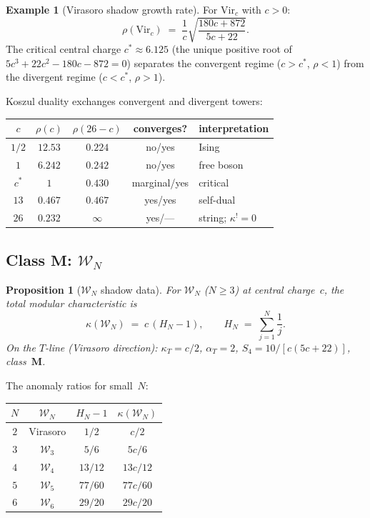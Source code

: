 \documentclass[11pt,reqno]{amsart}
\newtheorem{proposition}[theorem]{Proposition}
\theoremstyle{definition}
\newtheorem{example}[theorem]{Example}
\theoremstyle{remark}
\newcommand{\cW}{\mathcal{W}}
\newcommand{\Vir}{\mathrm{Vir}}
\numberwithin{equation}{section}
\begin{document}
\begin{example}[Virasoro shadow growth
rate]\label{ex:virasoro-rho}
For $\Vir_c$ with $c > 0$:
\[
 \rho(\Vir_c)
 \;=\;
 \frac{1}{c}
 \sqrt{\frac{180c + 872}{5c + 22}}.
\]
The critical central charge $c^* \approx 6.125$ (the
unique positive root of $5c^3 + 22c^2 - 180c - 872 = 0$)
separates the convergent regime ($c > c^*$, $\rho < 1$)
from the divergent regime ($c < c^*$, $\rho > 1$).

Koszul duality exchanges convergent and divergent towers:
\begin{center}
\renewcommand{\arraystretch}{1.2}
\begin{tabular}{ccccl}
\toprule
$c$ & $\rho(c)$ & $\rho(26{-}c)$ & converges? &
 interpretation \\
\midrule
$1/2$ & $12.53$ & $0.224$ & no/yes & Ising \\
$1$ & $6.242$ & $0.242$ & no/yes & free boson \\
$c^*$ & $1$ & $0.430$ & marginal/yes & critical \\
$13$ & $0.467$ & $0.467$ & yes/yes & self-dual \\
$26$ & $0.232$ & $\infty$ & yes/--- &
 string; $\kappa^! = 0$ \\
\bottomrule
\end{tabular}
\end{center}
\end{example}


\subsection{Class $\mathbf{M}$:
$\cW_N$}\label{subsec:wn}

\begin{proposition}[$\cW_N$ shadow
data]\label{prop:wn}
For $\cW_N$ ($N \ge 3$) at central charge~$c$, the
total modular characteristic is
\[
 \kappa(\cW_N)
 \;=\;
 c\,(H_N - 1),
 \qquad
 H_N \;=\; \sum_{j=1}^{N} \frac{1}{j}.
\]
On the $T$-line (Virasoro direction):
$\kappa_T = c/2$, $\alpha_T = 2$,
$S_4 = 10/[c(5c+22)]$, class~$\mathbf{M}$.
\end{proposition}

The anomaly ratios for small~$N$:

\begin{center}
\renewcommand{\arraystretch}{1.2}
\begin{tabular}{cccc}
\toprule
$N$ & $\cW_N$ & $H_N - 1$ & $\kappa(\cW_N)$ \\
\midrule
$2$ & Virasoro & $1/2$ & $c/2$ \\
$3$ & $\cW_3$ & $5/6$ & $5c/6$ \\
$4$ & $\cW_4$ & $13/12$ & $13c/12$ \\
$5$ & $\cW_5$ & $77/60$ & $77c/60$ \\
$6$ & $\cW_6$ & $29/20$ & $29c/20$ \\
\bottomrule
\end{tabular}
\end{center}
\end{document}
